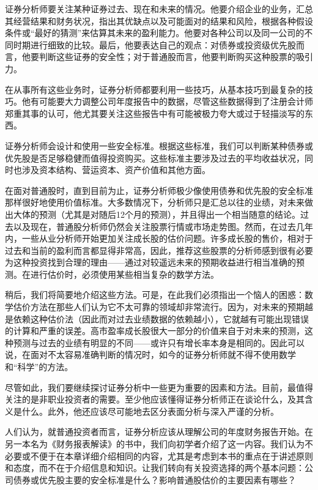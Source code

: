 \documentclass[12pt,oneside]{book}
\begin{document}
证券分析师要关注某种证券过去、现在和未来的情况。他要介绍企业的业务，汇总其经营结果和财务状况，指出其优缺点以及可能面对的结果和风险，根据各种假设条件或“最好的猜测”来估算其未来的盈利能力。他要对各种公司以及同一公司的不同时期进行细致的比较。最后，他要表达自己的观点：对债券或投资级优先股而言，他要判断这些证券的安全性；对于普通股而言，他要判断购买这种股票的吸引力。

在从事所有这些业务时，证券分析师都要利用一些技巧，从基本技巧到最复杂的技巧。他有可能要大力调整公司年度报告中的数据，尽管这些数据得到了注册会计师郑重其事的认可，他尤其要关注这些报告中有可能被极力夸大或过于轻描淡写的东西。

证券分析师会设计和使用一些安全标准。根据这些标准，我们可以判断某种债券或优先股是否足够稳健而值得投资购买。这些标准主要涉及过去的平均收益状况，同时也涉及资本结构、营运资本、资产价值和其他方面。

在面对普通股时，直到目前为止，证券分析师极少像使用债券和优先股的安全标准那样很好地使用价值标准。大多数情况下，分析师只是汇总以往的业绩，对未来做出大体的预测（尤其是对随后12个月的预测），并且得出一个相当随意的结论。过去以及现在，普通股分析师仍然会关注股票行情或市场走势图。然而，在过去几年内，一些从业分析师开始更加关注成长股的估价问题。许多成长股的售价，相对于过去和当前的盈利而言都显得非常高，因此，推荐这些股票的分析师感到很有必要为这种投资找到合理的理由——通过对较遥远未来的预期收益进行相当准确的预测。在进行估价时，必须使用某些相当复杂的数学方法。

稍后，我们将简要地介绍这些方法。可是，在此我们必须指出一个恼人的困惑：数学估价方法在那些人们认为它不太可靠的领域却非常流行。因为，对未来的预期越是依赖这种估价法（因此而对过去业绩数据的依赖越小），它就越有可能出现错误的计算和严重的误差。高市盈率成长股很大一部分的价值来自于对未来的预测，这种预测与过去的业绩有明显的不同——或许只有增长率本身是相同的。因此可以说，在面对不太容易准确判断的情况时，如今的证券分析师就不得不使用数学和“科学”的方法。

尽管如此，我们要继续探讨证券分析中一些更为重要的因素和方法。目前，最值得关注的是非职业投资者的需要。至少他应该懂得证券分析师正在谈论什么，及其含义是什么。此外，他还应该尽可能地去区分表面分析与深入严谨的分析。

人们认为，就普通投资者而言，证券分析应该从理解公司的年度财务报告开始。在另一本名为《财务报表解读》的书中，我们向初学者介绍了这一内容。我们认为不必要或不便于在本章详细介绍相同的内容，尤其是考虑到本书的重点在于讲述原则和态度，而不在于介绍信息和知识。让我们转向有关投资选择的两个基本问题：公司债券或优先股主要的安全标准是什么？影响普通股估价的主要因素有哪些？
\end{document}
